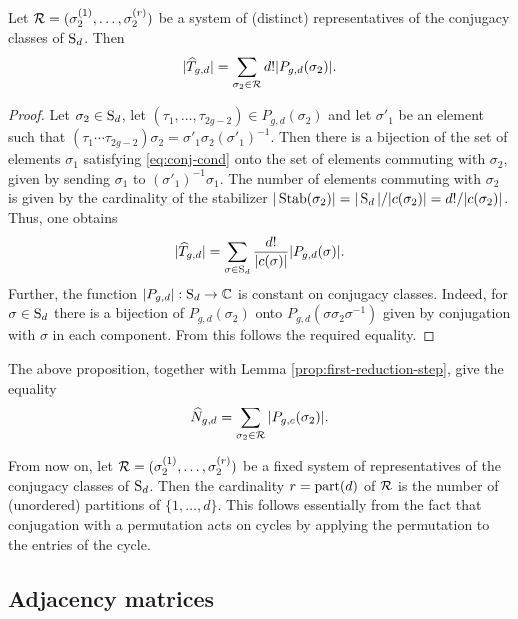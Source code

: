 \begin{prop}
 Let $\mathcal{R}=(\sigma_2^{(1)},\dotsc,\sigma_2^{(r)})$ be a system of (distinct) representatives of the conjugacy classes of $\operatorname{S}_d$. Then \[|\widehat{T}_{g,d}|=\sum_{\sigma_2\in\mathcal{R}}d!|P_{g,d}(\sigma_2)|.\]
\end{prop}
\begin{proof}
 Let $\sigma_2 \in \operatorname{S}_d$, let $(\tau_1,\dotsc,\tau_{2g-2}) \in P_{g,d}(\sigma_2)$ and let $\sigma'_1$ be an element such that $(\tau_1 \dotsm \tau_{2g-2})\sigma_2=\sigma'_1\sigma_2(\sigma'_1)^{-1}$. Then there is a bijection of the set of elements $\sigma_1$ satisfying \eqref{eq:conj-cond} onto the set of elements commuting with $\sigma_2$, given by sending $\sigma_1$ to $(\sigma'_1)^{-1}\sigma_1$. The number of elements commuting with $\sigma_2$ is given by the cardinality of the stabilizer $|\operatorname{Stab}(\sigma_2)|=|\operatorname{S}_d|/|c(\sigma_2)|=d!/|c(\sigma_2)|$. Thus, one obtains 
 \[
  |\widehat{T}_{g,d}|=\sum_{\sigma\in\operatorname{S}_d}\frac{d!}{|c(\sigma)|}|P_{g,d}(\sigma)|.
 \]
Further, the function $|P_{g,d}|:\operatorname{S}_d\to\mathbb{C}$ is constant on conjugacy classes. Indeed, for $\sigma\in\operatorname{S}_d$ there is a bijection of $P_{g,d}(\sigma_2)$ onto $P_{g,d}(\sigma\sigma_2\sigma^{-1})$ given by conjugation with $\sigma$ in each component. From this follows the required equality.
\end{proof}

\begin{cor} \label{prop:first-second-reduction-step}
 The above proposition, together with Lemma \ref{prop:first-reduction-step}, give the equality
 \[
  \widehat{N}_{g,d}=\sum_{\sigma_2\in\mathcal{R}}|P_{g,c}(\sigma_2)|.
 \]
\end{cor}

From now on, let $\mathcal{R}=(\sigma_2^{(1)},\dotsc,\sigma_2^{(r)})$ be a fixed system of representatives of the conjugacy classes of $\operatorname{S}_d$. Then the cardinality $r=\operatorname{part}(d)$ of $\mathcal{R}$ is the number of (unordered) partitions of $\{1,\dotsc,d\}$. This follows essentially from the fact that conjugation with a permutation acts on cycles by applying the permutation to the entries of the cycle.

\subsection{Adjacency matrices}

